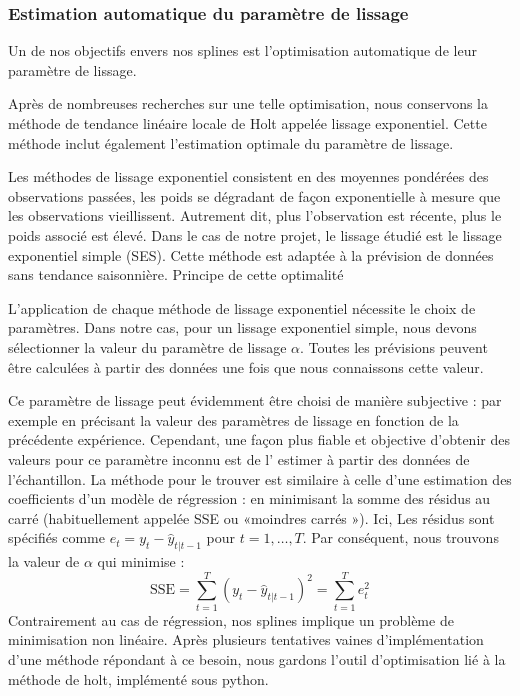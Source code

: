 \documentclass[a4paper,12pt]{article} %
\begin{document}
			\subsubsection{Estimation automatique du paramètre de lissage}
    			
    			Un de nos objectifs envers nos splines est l'optimisation automatique de leur paramètre de lissage. 
                
                Après de nombreuses recherches sur une telle optimisation, nous conservons la méthode de tendance linéaire locale de Holt appelée lissage exponentiel. Cette méthode inclut également l'estimation optimale du paramètre de lissage.
                
                Les méthodes de lissage exponentiel  consistent en des moyennes pondérées des observations passées, les poids se dégradant de façon exponentielle à mesure que les observations vieillissent. Autrement dit, plus l’observation est récente, plus le poids associé est élevé. 
                Dans le cas de notre projet, le lissage étudié est le lissage exponentiel simple (SES). Cette méthode est adaptée à la prévision de données sans tendance saisonnière. 
                Principe de cette optimalité
                
                L’application de chaque méthode de lissage exponentiel nécessite le choix de paramètres. Dans notre cas, pour un lissage exponentiel simple, nous devons sélectionner la valeur du paramètre de lissage  $\alpha$. Toutes les prévisions peuvent être calculées à partir des données une fois que nous connaissons cette valeur. 
                
                Ce  paramètre de lissage peut évidemment être choisi de manière subjective : par exemple en précisant la valeur des paramètres de lissage en fonction de la précédente expérience. Cependant, une façon plus fiable et objective d’obtenir des valeurs pour ce paramètre inconnu est de l' estimer à partir des données de l'échantillon. La méthode pour le trouver est similaire à celle d'une estimation des  coefficients d’un modèle de régression :  en minimisant la somme des résidus au carré (habituellement appelée SSE ou «moindres carrés »).  Ici, Les résidus sont spécifiés comme $e_t=y_t - \hat{y}_{t|t-1}$ pour $t=1,\dots,T$. Par conséquent, nous trouvons la valeur de $\alpha$ qui minimise :
                \begin{equation}
                 \text{SSE}=\sum_{t=1}^T(y_t - \hat{y}_{t|t-1})^2=\sum_{t=1}^Te_t^2
                \end{equation}
                Contrairement au cas de régression, nos splines implique un problème de minimisation non linéaire.
                Après plusieurs tentatives vaines d'implémentation d'une méthode répondant à ce besoin, nous gardons l'outil d’optimisation lié à la méthode de holt, implémenté sous python. 
\end{document}
